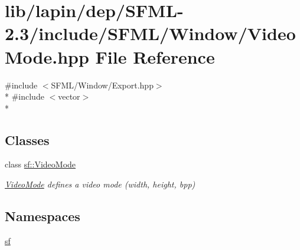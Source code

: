 \hypertarget{lapin_2dep_2_s_f_m_l-2_83_2include_2_s_f_m_l_2_window_2_video_mode_8hpp}{\section{lib/lapin/dep/\-S\-F\-M\-L-\/2.3/include/\-S\-F\-M\-L/\-Window/\-Video\-Mode.hpp File Reference}
\label{lapin_2dep_2_s_f_m_l-2_83_2include_2_s_f_m_l_2_window_2_video_mode_8hpp}
}
{\ttfamily \#include $<$S\-F\-M\-L/\-Window/\-Export.\-hpp$>$}\\*
{\ttfamily \#include $<$vector$>$}\\*
\subsection*{Classes}
\begin{DoxyCompactItemize}
\item 
class \hyperlink{classsf_1_1_video_mode}{sf\-::\-Video\-Mode}
\begin{DoxyCompactList}\small\item\em \hyperlink{classsf_1_1_video_mode}{Video\-Mode} defines a video mode (width, height, bpp) \end{DoxyCompactList}\end{DoxyCompactItemize}
\subsection*{Namespaces}
\begin{DoxyCompactItemize}
\item 
\hyperlink{namespacesf}{sf}
\end{DoxyCompactItemize}

